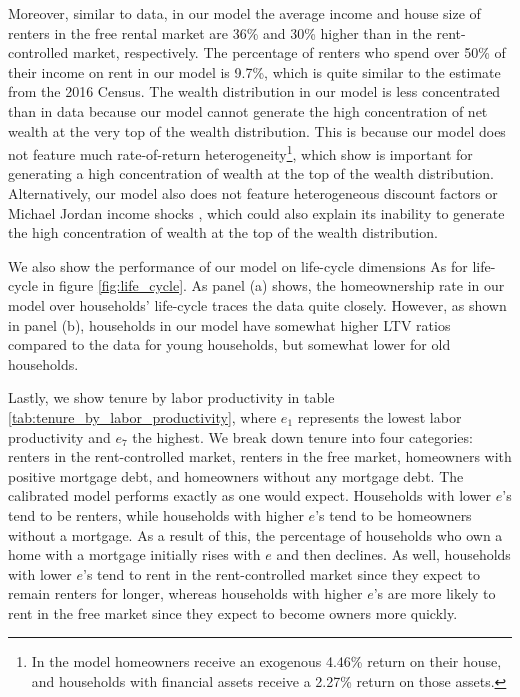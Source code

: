\documentclass[parskip=full]{article}
\begin{document}
Moreover, similar to data, in our model the average income and house size of renters in the free rental market are 36\% and 30\% higher than in the rent-controlled market, respectively. The percentage of renters who spend over 50\% of their income on rent in our model is 9.7\%, which is quite similar to the estimate from the 2016 Census. The wealth distribution in our model is less concentrated than in data because our model cannot generate the high concentration of net wealth at the very top of the wealth distribution. This is because our model does not feature much rate-of-return heterogeneity\footnote{In the model homeowners receive an exogenous 4.46\% return on their house, and households with financial assets receive a 2.27\% return on those assets.}, which \citet{fagereng} show is important for generating a high concentration of wealth at the top of the wealth distribution. Alternatively, our model also does not feature heterogeneous discount factors \citep{ks-1998} or Michael Jordan income shocks \citep{mj-shocks}, which could also explain its inability to generate the high concentration of wealth at the top of the wealth distribution.

We also show the performance of our model on life-cycle dimensions As for life-cycle in figure \ref{fig:life_cycle}. As panel (a) shows, the homeownership rate in our model over households' life-cycle traces the data quite closely. However, as shown in panel (b), households in our model have somewhat higher LTV ratios compared to the data for young households, but somewhat lower for old households. 

Lastly, we show tenure by labor productivity in table \ref{tab:tenure_by_labor_productivity}, where $e_{1}$ represents the lowest labor productivity and $e_{7}$ the highest. We break down tenure into four categories: renters in the rent-controlled market, renters in the free market, homeowners with positive mortgage debt, and homeowners without any mortgage debt. The calibrated model performs exactly as one would expect. Households with lower $e$'s tend to be renters, while households with higher $e$'s tend to be homeowners without a mortgage. As a result of this, the percentage of households who own a home with a mortgage initially rises with $e$ and then declines. As well, households with lower $e$'s tend to rent in the rent-controlled market since they expect to remain renters for longer, whereas households with higher $e$'s are more likely to rent in the free market since they expect to become owners more quickly. 
\end{document}
